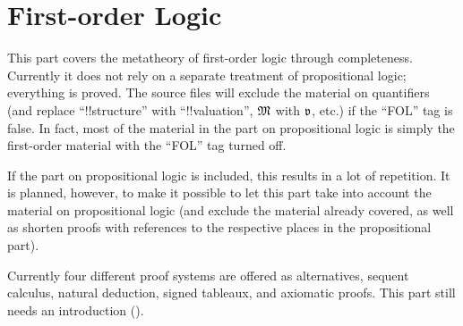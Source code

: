 \documentclass[../../include/open-logic-part]{subfiles}
\begin{document}
\part{First-order Logic}

\begin{editorial}
  This part covers the metatheory of first-order logic through
  completeness.  Currently it does not rely on a separate treatment of
  propositional logic; everything is proved.  The source files will
  exclude the material on quantifiers (and replace ``!!{structure}''
  with ``!!{valuation}'', $\Struct{M}$ with $\pAssign{v}$, etc.) if
  the ``FOL'' tag is false. In fact, most of the material in the part
  on propositional logic is simply the first-order material with the
  ``FOL'' tag turned off.

  If the part on propositional logic is included, this results in a
  lot of repetition. It is planned, however, to make it possible to
  let this part take into account the material on propositional logic
  (and exclude the material already covered, as well as shorten proofs
  with references to the respective places in the propositional
  part).

  Currently four different proof systems are offered as
  alternatives, sequent calculus, natural deduction, signed tableaux,
  and axiomatic proofs. This part still needs an introduction
  ().
\end{editorial}











\OLEndPartHook
\end{document}
